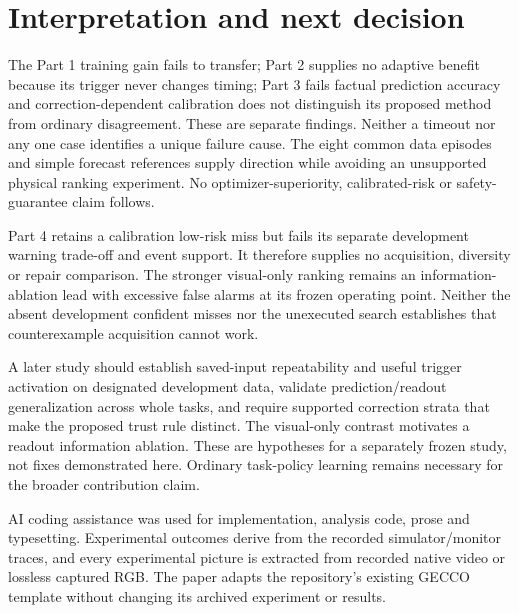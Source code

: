 \documentclass[sigconf,dvipsnames]{acmart}
\begin{document}
\section{Interpretation and next decision}
The Part 1 training gain fails to transfer; Part 2 supplies no adaptive benefit
because its trigger never changes timing; Part 3 fails factual prediction accuracy
and correction-dependent calibration does not distinguish its proposed method from
ordinary disagreement. These are separate findings. Neither a timeout nor any one
case identifies a unique failure cause. The eight common data episodes and simple
forecast references supply direction while avoiding an unsupported physical ranking
experiment. No optimizer-superiority, calibrated-risk or safety-guarantee claim follows.

Part 4 retains a calibration low-risk miss but fails its separate development
warning trade-off and event support. It therefore supplies no acquisition,
diversity or repair comparison. The stronger visual-only ranking remains an
information-ablation lead with excessive false alarms at its frozen operating
point. Neither the absent development confident misses nor the unexecuted
search establishes that counterexample acquisition cannot work.

A later study should establish saved-input repeatability and useful trigger activation
on designated development data, validate prediction/readout generalization across
whole tasks, and require supported correction strata that make the proposed trust
rule distinct. The visual-only contrast motivates a readout information ablation.
These are hypotheses for a separately frozen study, not fixes demonstrated here.
Ordinary task-policy learning remains necessary for the broader contribution claim.

\begin{acks}
AI coding assistance was used for implementation, analysis code, prose and typesetting.
Experimental outcomes derive from the recorded simulator/monitor traces, and every
experimental picture is extracted from recorded native video or lossless captured RGB. The paper adapts the repository's
existing GECCO template without changing its archived experiment or results.
\end{acks}


\end{document}
